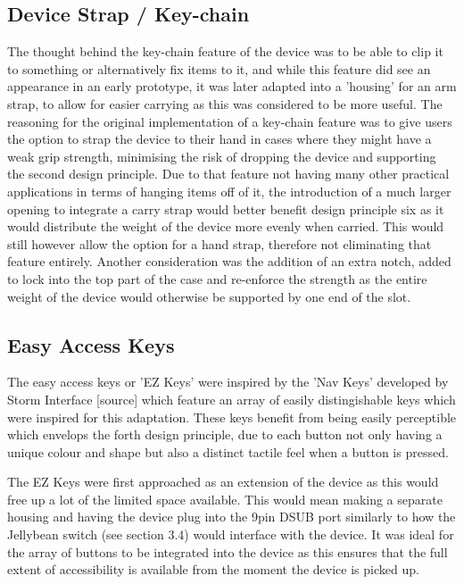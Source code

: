 \subsection{Device Strap / Key-chain}

The thought behind the key-chain feature of the device was to be able to clip it to something or alternatively fix items to it, and while this feature did see an appearance in an early prototype, it was later adapted into a 'housing' for an arm strap, to allow for easier carrying as this was considered to be more useful.
The reasoning for the original implementation of a key-chain feature was to give users the option to strap the device to their hand in cases where they might have a weak grip strength, minimising the risk of dropping the device and supporting the second design principle.
Due to that feature not having many other practical applications in terms of hanging items off of it, the introduction of a much larger opening to integrate a carry strap would better benefit design principle six as it would distribute the weight of the device more evenly when carried.
This would still however allow the option for a hand strap, therefore not eliminating that feature entirely.
Another consideration was the addition of an extra notch, added to lock into the top part of the case and re-enforce the strength as the entire weight of the device would otherwise be supported by one end of the slot. %

\subsection{Easy Access Keys}

The easy access keys or 'EZ Keys' were inspired by the 'Nav Keys' developed by Storm Interface [source] which feature an array of easily distingishable keys which were inspired for this adaptation.
These keys benefit from being easily perceptible which envelops the forth design principle, due to each button not only having a unique colour and shape but also a distinct tactile feel when a button is pressed.

The EZ Keys were first approached as an extension of the device as this would free up a lot of the limited space available.
This would mean making a separate housing and having the device plug into the 9pin DSUB port similarly to how the Jellybean switch (see section 3.4) would interface with the device.
It was ideal for the array of buttons to be integrated into the device as this ensures that the full extent of accessibility is available from the moment the device is picked up.

